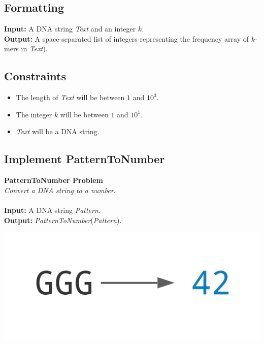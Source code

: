 \documentclass{article}
\begin{document}
\subsection*{Formatting}
\textbf{Input:} A DNA string \emph{Text} and an integer $k$.\\
\noindent \textbf{Output:} A space-separated list of integers representing the frequency array of $k$-mers in \emph{Text}).

\subsection*{Constraints}
\begin{itemize}
    \item The length of \emph{Text} will be between $1$ and $10^3$.
    \item The integer $k$ will be between $1$ and $10^1$.
    \item \emph{Text} will be a DNA string.
\end{itemize}
\pagebreak
\subsection{Implement PatternToNumber}
\hline\vspace{5}
\noindent \textbf{PatternToNumber Problem}\\
\emph{Convert a DNA string to a number}.\\ \\
\textbf{Input:} A DNA string \emph{Pattern}.\\
\textbf{Output:} \emph{PatternToNumber}(\emph{Pattern}).
\begin{center}
    \includegraphics[scale=0.2]{c1/logos/1L.png} 
\end{center}
\hline\vspace{5}
\end{document}

